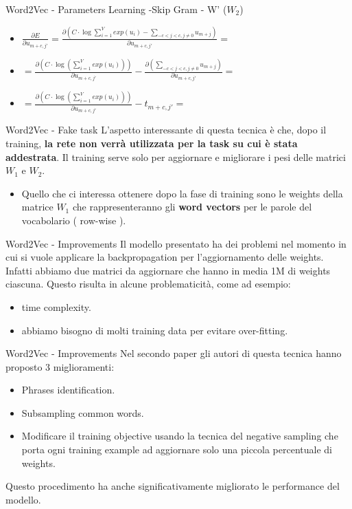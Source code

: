 \documentclass[british]{beamer}
\begin{document}
\begin{frame}{Word2Vec - Parameters Learning -Skip Gram - W' (\(W_2\))}
	\begin{itemize}
		\item \( \frac{\partial E}{\partial u_{m+c,j'}} = \frac{\partial \left( C \cdot \log \sum_{i=1}^{V} exp(u_i) - \sum_{-c<j<c,j\neq0} u_{m+j}\right)}{\partial u_{m+c,j'}} = \)
		\item \( = \frac{\partial \left(C \cdot \log \left( \sum_{i=1}^{V} exp(u_i) \right)\right)}{\partial u_{m+c,j'}} - \frac{\partial \left( \sum_{-c<j<c,j\neq0} u_{m+j}\right)}{\partial u_{m+c,j'}}=\)
		\item \( = \frac{\partial \left(C \cdot \log \left( \sum_{i=1}^{V} exp(u_i) \right)\right)}{\partial u_{m+c,j'}} - t_{m+c,j'}=\)
	\end{itemize}
\end{frame}

\begin{frame}{Word2Vec - Fake task}
	L'aspetto interessante di questa tecnica \`{e} che, dopo il training, \textbf{la rete non verr\`{a} utilizzata per la task su cui \`{e} stata addestrata}. Il training serve solo per aggiornare e migliorare i pesi delle matrici \(W_1\) e \(W_2\).
	\begin{itemize}
		\item Quello che ci interessa ottenere dopo la fase di training sono le weights della matrice \(W_1\) che rappresenteranno gli \textbf{word vectors} per le parole del vocabolario ( row-wise ).
	\end{itemize}
\end{frame}

\begin{frame}{Word2Vec - Improvements}
	Il modello presentato ha dei problemi nel momento in cui si vuole applicare la backpropagation per l'aggiornamento delle weights.
	Infatti abbiamo due matrici da aggiornare che hanno in media 1M di weights ciascuna.
	Questo risulta in alcune problematicit\`{a}, come ad esempio:
	\begin{itemize}
		\item time complexity.
		\item abbiamo bisogno di molti training data per evitare over-fitting.
	\end{itemize}
\end{frame}
\begin{frame}{Word2Vec - Improvements}
	Nel secondo paper gli autori di questa tecnica hanno proposto 3 miglioramenti:
	\begin{itemize}
		\item Phrases identification.
		\item Subsampling common words.
		\item Modificare il training objective usando la tecnica del negative sampling che porta ogni training example ad aggiornare solo una piccola percentuale di weights.
	\end{itemize}
	Questo procedimento ha anche significativamente migliorato le performance del modello.
\end{frame}
\end{document}
